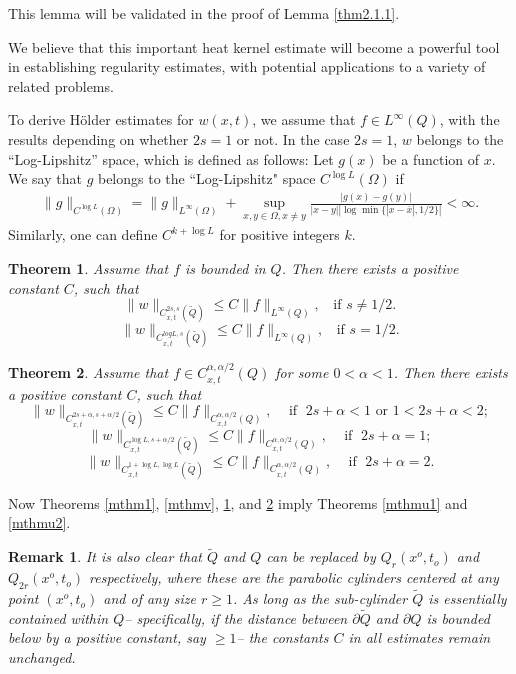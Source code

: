 \documentclass[12pt]{article}
\newtheorem{mthm}{Theorem}
\newtheorem{mrem}{Remark}
\theoremstyle{remark}
\numberwithin{equation}{section}
\begin{document}
 This lemma will be validated in the proof of Lemma \ref{thm2.1.1}.
 \smallskip

 We believe that this important heat kernel estimate will become a powerful tool in establishing regularity estimates, with potential applications to a variety of related problems.
\medskip



To derive H\"{o}lder estimates for $w(x,t)$, we assume that $f \in L^\infty (Q)$, with the results depending on whether $2s=1$ or not.
In the case $2s=1$, $w$ belongs to the ``Log-Lipshitz'' space, which is defined as follows:
Let $g(x)$ be a function of $x$. We say that $g$ belongs to the ``Log-Lipshitz" space
 $C^{\log L}(\Omega)$ if
\begin{eqnarray*}
\|g\|_{C^{\log L}(\Omega)}=\|g\|_{L^\infty (\Omega)}+ \sup_{x, y\in \Omega, x\neq y} \frac{|g(x)-g(y)|}{|x-y|  |\log \min\{|x-\bar{x}|, 1/2\}|}<\infty.
\end{eqnarray*}
Similarly, one can define $C^{k + \log L}$ for positive integers $k$.



\begin{mthm} \label{mthmw1}  Assume that $f$ is bounded in $Q$. Then there exists a positive constant $C$, such that
$$
\|w\|_{C^{2s, s}_{x, t} (\tilde{Q})} \leq C \|f\|_{L^\infty (Q)}, \;\; \mbox{ if } s \neq 1/2.
$$
$$
\|w\|_{C^{log L, s}_{x, t} (\tilde{Q})} \leq C \|f\|_{L^\infty (Q)}, \;\; \mbox{ if } s = 1/2.
$$
\end{mthm}

\begin{mthm} \label{mthmw2} Assume that $f \in C^{\alpha, \alpha/2}_{x,t}  (Q)$ for some $0 < \alpha < 1$. Then there exists a positive constant $C$, such that
$$
\|w\|_{C^{2s+ \alpha, s+\alpha/2}_{x, t} (\tilde{Q})} \leq C \|f\|_{C^{\alpha, \alpha/2}_{x,t}  (Q)}, \; \; \; \mbox{ if } \; 2s +\alpha < 1 \mbox{ or } 1< 2s +\alpha < 2;
$$
$$
\|w\|_{C^{\log L, s+\alpha/2}_{x, t} (\tilde{Q})} \leq C \|f\|_{C^{\alpha, \alpha/2}_{x,t}  (Q)}, \; \; \; \mbox{ if } \; 2s + \alpha = 1;
$$
$$
\|w\|_{C^{1+\log L, \log L}_{x, t} (\tilde{Q})} \leq C \|f\|_{C^{\alpha, \alpha/2}_{x,t}  (Q)}, \;\;\; \mbox{ if } \; 2s + \alpha = 2.
$$
\end{mthm}

Now Theorems \ref{mthm1}, \ref{mthmv}, \ref{mthmw1}, and \ref{mthmw2} imply Theorems \ref{mthmu1} and \ref{mthmu2}.



\begin{mrem}

It is also clear that $\tilde{Q}$ and $Q$ can be replaced by $Q_r (x^o, t_o)$ and $Q_{2r}(x^o, t_o)$ respectively, where these are the parabolic cylinders centered at any point $(x^o, t_o)$ and of any size $r \geq 1$. As long as the sub-cylinder $\tilde{Q}$ is essentially contained within $Q$-- specifically, if
the distance between $\partial \tilde{Q}$ and $\partial Q$ is bounded below by a positive constant, say $\geq 1$-- the constants $C$ in all estimates remain unchanged.
\end{mrem}
\medskip
\end{document}
